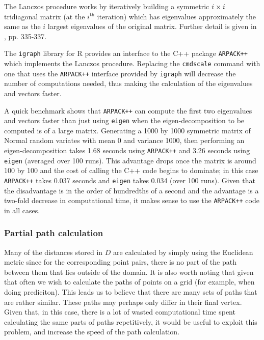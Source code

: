 The  Lanczos procedure works by iteratively building a symmetric $i\times i$ tridiagonal matrix (at the $i^{\text{th}}$ iteration) which has eigenvalues approximately the same as the $i$ largest eigenvalues of the original matrix. Further detail is given in \cite{simonbook}, pp. 335-337.

The \texttt{igraph} library for \textsf{R} provides an interface to the C++ package \texttt{ARPACK++} which implements the Lanczos procedure. Replacing the \texttt{cmdscale} command with one that uses the \texttt{ARPACK++} interface provided by \texttt{igraph} will decrease the number of computations needed, thus making the calculation of the eigenvalues and vectors faster.

A quick benchmark shows that \texttt{ARPACK++} can compute the first two eigenvalues and vectors faster than just using \texttt{eigen} when the eigen-decomposition to be computed is of a large matrix. Generating a 1000 by 1000 symmetric matrix of Normal random variates with mean 0 and variance 1000, then performing an eigen-decomposition takes 1.68 seconds using \texttt{ARPACK++} and 3.26 seconds using \texttt{eigen} (averaged over 100 runs). This advantage drops once the matrix is around 100 by 100 and the cost of calling the C++ code begins to dominate; in this case \texttt{ARPACK++} takes 0.037 seconds and \texttt{eigen} takes 0.034 (over 100 runs). Given that the disadvantage is in the order of hundredths of a second and the advantage is a two-fold decrease in computational time, it makes sense to use the \texttt{ARPACK++} code in all cases.


\subsubsection{Partial path calculation}

Many of the distances stored in $D$ are calculated by simply using the Euclidean metric since for the corresponding point pairs, there is no part of the path between them that lies outside of the domain. It is also worth noting that given that often we wish to calculate the paths of points on a grid (for example, when doing prediciton). This leads us to believe that there are many sets of paths that are rather similar. These paths may perhaps only differ in their final vertex. Given that, in this case, there is a lot of wasted computational time spent calculating the same parts of paths repetitively, it would be useful to exploit this problem, and increase the speed of the path calculation.

